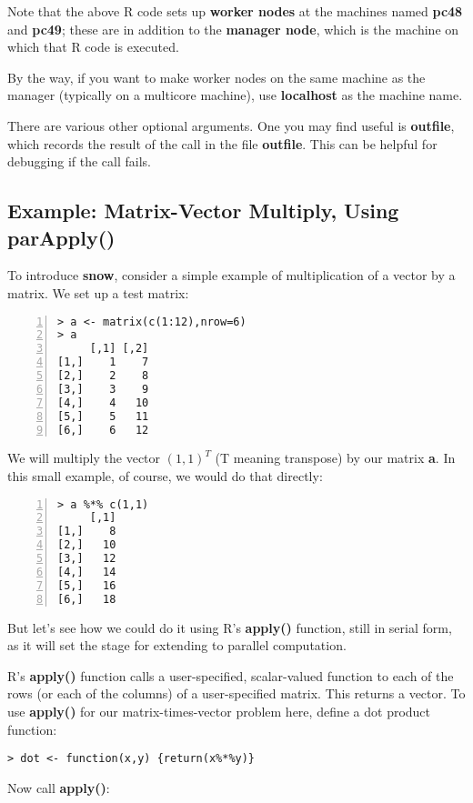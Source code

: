 Note that the above R code sets up {\bf worker nodes} at the machines
named {\bf pc48} and {\bf pc49}; these are in addition to the {\bf
manager node}, which is the machine on which that R code is
executed.  

By the way, if you want to make worker nodes on the same machine as the
manager (typically on a multicore machine), use {\bf localhost} as the
machine name.

There are various other optional arguments.  One you may find useful is
{\bf outfile}, which records the result of the call in the file {\bf
outfile}.  This can be helpful for debugging if the call fails.

\subsection{Example:  Matrix-Vector Multiply, Using parApply()}

To introduce {\bf snow}, consider a simple example of multiplication of
a vector by a matrix.  We set up a test matrix:

\begin{lstlisting}[numbers=left]
> a <- matrix(c(1:12),nrow=6)
> a
     [,1] [,2]
[1,]    1    7
[2,]    2    8
[3,]    3    9
[4,]    4   10
[5,]    5   11
[6,]    6   12
\end{lstlisting}

We will multiply the vector $(1,1)^{T}$ (T meaning transpose) by our
matrix {\bf a}.  In this small example, of course, we would do that
directly:

\begin{lstlisting}[numbers=left]
> a %*% c(1,1)
     [,1]
[1,]    8
[2,]   10
[3,]   12
[4,]   14
[5,]   16
[6,]   18
\end{lstlisting}


But let's see how we could do it using R's {\bf apply()} function, still
in serial form, as it will set the stage for extending to parallel
computation.

R's {\bf apply()} function calls a user-specified, scalar-valued
function to each of the rows (or each of the columns) of a
user-specified matrix.  This returns a vector.  To use {\bf apply()} for
our matrix-times-vector problem here, define a dot product function:

\begin{lstlisting}
> dot <- function(x,y) {return(x%*%y)}
\end{lstlisting}

Now call {\bf apply()}:

